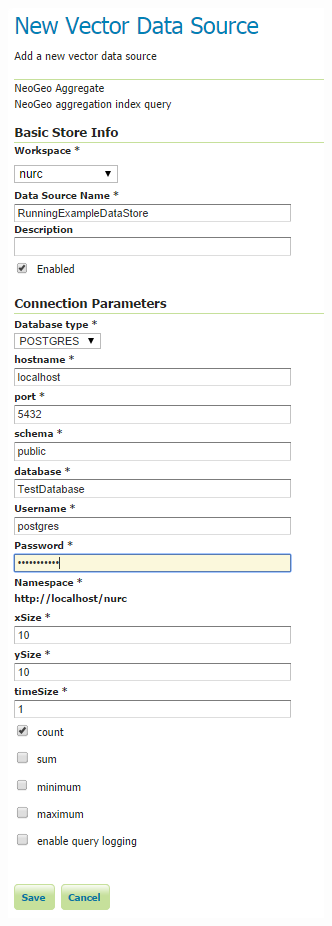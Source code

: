 \begin{figure}[h!tb]
	\centering
		\begin{minipage}{0.5\textwidth}
			\centering 	\includegraphics[width=.94\textwidth]{Figures/CreateStore.png}

\end{minipage}
\end{figure}
